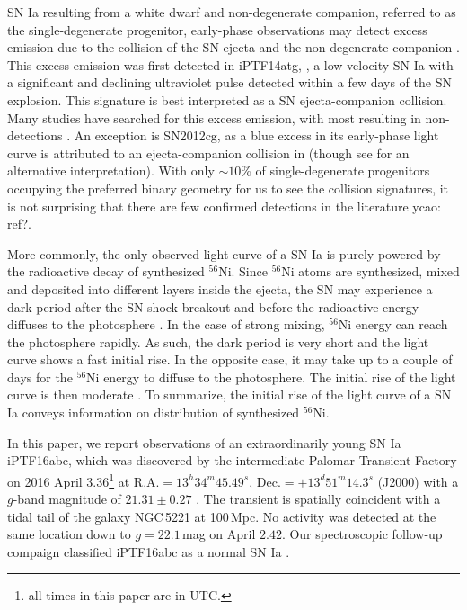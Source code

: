 \documentclass[twocolumn]{aastex61}
\newcommand{\ycao}[1]{{\color{red} ycao: {#1}}}
\begin{document}
SN Ia resulting from a white dwarf and non-degenerate companion, referred to as the single-degenerate progenitor, early-phase observations may detect excess emission due to the collision of the SN ejecta and the non-degenerate companion \citep{1973ApJ...186.1007W,2010ApJ...708.1025K}. This excess emission was first detected in iPTF14atg,  \citep{2015Natur.521..328C}, a low-velocity SN Ia with a significant and declining ultraviolet pulse detected within a
few days of the SN explosion. This signature is best interpreted as a
SN ejecta-companion collision. Many studies have searched for this excess emission, with most resulting in non-detections
\citep{2010ApJ...722.1691H,2011ApJ...741...20B,2012ApJ...744...38F,
  2012ApJ...744L..17B,2015Natur.521..332O,
  2013ApJ...778L..15Z,2015ApJ...799..106G,2016ApJ...826..144S,
  2015ApJS..221...22I}. An exception is SN2012cg, 
  as a blue excess in its early-phase light curve is attributed to an ejecta-companion collision in \citet{2016ApJ...820...92M} (though see \citealt{2016arXiv161007601S} for an alternative interpretation). 
With only $\sim 10\%$ of single-degenerate progenitors occupying the preferred binary geometry for us to see the collision
signatures, it is not surprising that there are few confirmed detections in the literature \ycao{ref?}. 

More commonly, the only observed light curve of a SN Ia is purely
powered by the radioactive decay of synthesized $^{56}$Ni. Since
$^{56}$Ni atoms are synthesized, mixed and deposited into different
layers inside the ejecta, the SN may experience a dark period after
the SN shock breakout and before the radioactive energy diffuses to
the photosphere \citep{2014ApJ...784...85P}. In the case of strong
mixing, $^{56}$Ni energy can reach the photosphere rapidly. As such,
the dark period is very short and the light curve shows a fast initial
rise. In the opposite case, it may take up to a couple of days for
the $^{56}$Ni energy to diffuse to the photosphere. The initial rise
of the light curve is then moderate \citep{2016ApJ...826...96P}. To
summarize, the initial rise of the light curve of a SN Ia conveys
information on distribution of synthesized $^{56}$Ni. 

In this paper, we report observations of an extraordinarily young SN
Ia iPTF16abc, which was discovered by the intermediate Palomar
Transient Factory on 2016 April $3.36$\footnote{all times in this
  paper are in UTC.} at $\textrm{R.A.}=13^h34^m45.49^s$,
$\textrm{Dec.}=+13^d51^m14.3^s$ (J2000) with a $g$-band magnitude of
$21.31\pm0.27$ \citep{2016PASP..128k4502C,2016ATel.8907....1M}. The
transient is spatially coincident with a tidal tail of the galaxy
NGC\,5221 at 100\,Mpc. No activity was detected at the same location
down to $g=22.1$\,mag on April $2.42$. Our spectroscopic follow-up
compaign classified iPTF16abc as a normal SN Ia
\citep{2016ATel.8909....1C}.
\end{document}
